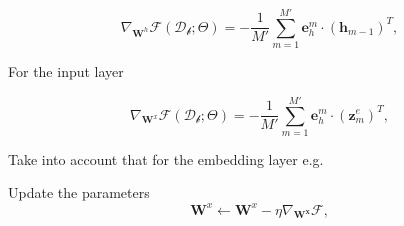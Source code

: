 \begin{algorithm}
\begin{algorithmic}[1]
        $$\nabla_{\mathbf{W}^h}\mathcal{F}(\mathcal{D_b};\Theta)  = -\frac{1}{M'} \sum_{m=1}^{M'} \mathbf{e}^m_h \cdot \left(\mathbf{h}_{m-1}\right)^T,$$

    For the input layer

        $$\nabla_{\mathbf{W}^x}\mathcal{F}(\mathcal{D_b};\Theta)  = -\frac{1}{M'} \sum_{m=1}^{M'} \mathbf{e}^m_h \cdot \left(\mathbf{z}^e_{m}\right)^T,$$

    Take into account that for the embedding layer e.g.

	\vspace{0.3cm}
    \STATE Update the parameters
        $$\mathbf{W}^x \leftarrow \mathbf{W}^x - \eta \nabla_\mathbf{W^x}\mathcal{F},$$
	\ENDFOR
	\ENDFOR
\end{algorithmic}
\end{algorithm}


